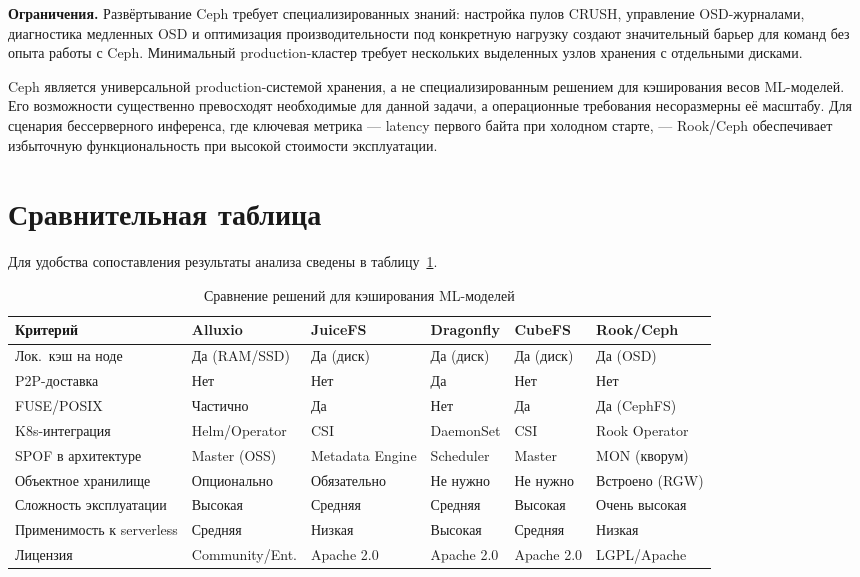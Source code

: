 \textbf{Ограничения.} Развёртывание Ceph требует специализированных знаний: настройка пулов CRUSH, управление OSD-журналами, диагностика медленных OSD и оптимизация производительности под конкретную нагрузку создают значительный барьер для команд без опыта работы с Ceph. Минимальный production-кластер требует нескольких выделенных узлов хранения с отдельными дисками.

Ceph является универсальной production-системой хранения, а не специализированным решением для кэширования весов ML-моделей. Его возможности существенно превосходят необходимые для данной задачи, а операционные требования несоразмерны её масштабу. Для сценария бессерверного инференса, где ключевая метрика --- latency первого байта при холодном старте, --- Rook/Ceph обеспечивает избыточную функциональность при высокой стоимости эксплуатации.

\section{Сравнительная таблица}
\label{sec:comparison_table}

Для удобства сопоставления результаты анализа сведены в таблицу~\ref{tab:solutions_comparison}.

\begin{table}[htbp]
\centering
\caption{Сравнение решений для кэширования ML-моделей}
\label{tab:solutions_comparison}
\footnotesize
\begin{tabularx}{\textwidth}{p{44mm}XXXXX}
\toprule
\textbf{Критерий} & \textbf{Alluxio} & \textbf{JuiceFS} & \textbf{Dragonfly} & \textbf{CubeFS} & \textbf{Rook/Ceph} \\
\midrule
Лок.\ кэш на ноде        & Да (RAM/SSD)   & Да (диск)      & Да (диск)      & Да (диск)      & Да (OSD) \\
P2P-доставка              & Нет            & Нет            & Да             & Нет            & Нет \\
FUSE/POSIX                & Частично       & Да             & Нет            & Да             & Да (CephFS) \\
K8s-интеграция            & Helm/Operator  & CSI            & DaemonSet      & CSI            & Rook Operator \\
SPOF в архитектуре        & Master (OSS)   & Metadata Engine & Scheduler     & Master         & MON (кворум) \\
Объектное хранилище       & Опционально    & Обязательно    & Не нужно       & Не нужно       & Встроено (RGW) \\
Сложность эксплуатации   & Высокая        & Средняя        & Средняя        & Высокая        & Очень высокая \\
Применимость к serverless & Средняя        & Низкая         & Высокая        & Средняя        & Низкая \\
Лицензия                  & Community/Ent. & Apache 2.0     & Apache 2.0     & Apache 2.0     & LGPL/Apache \\
\bottomrule
\end{tabularx}
\end{table}

